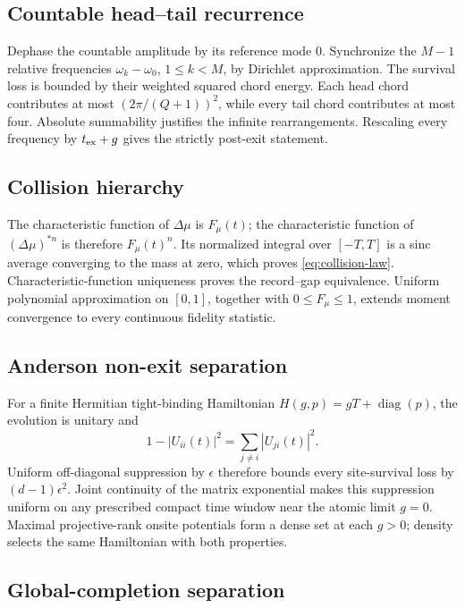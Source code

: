 \documentclass[10pt]{article}
\theoremstyle{definition}
\begin{document}
\subsection*{Countable head--tail recurrence}

Dephase the countable amplitude by its reference mode \(0\). Synchronize
the \(M-1\) relative frequencies
\(\omega_k-\omega_0\), \(1\le k<M\), by Dirichlet approximation. The
survival loss is bounded by their weighted squared chord energy. Each head
chord contributes at most \((2\pi/(Q+1))^2\), while every tail chord
contributes at most four. Absolute summability justifies the infinite
rearrangements. Rescaling every frequency by \(t_{\rm ex}+g\) gives the
strictly post-exit statement.

\subsection*{Collision hierarchy}

The characteristic function of \(\Delta\mu\) is \(F_\mu(t)\); the
characteristic function of \((\Delta\mu)^{*n}\) is therefore
\(F_\mu(t)^n\). Its normalized integral over \([-T,T]\) is a sinc average
converging to the mass at zero, which proves
\eqref{eq:collision-law}. Characteristic-function uniqueness proves the
record--gap equivalence. Uniform polynomial approximation on \([0,1]\),
together with \(0\le F_\mu\le1\), extends moment convergence to every
continuous fidelity statistic.

\subsection*{Anderson non-exit separation}

For a finite Hermitian tight-binding Hamiltonian
\(H(g,p)=gT+\operatorname{diag}(p)\), the evolution is unitary and
\[
 1-|U_{ii}(t)|^2=\sum_{j\ne i}|U_{ji}(t)|^2.
\]
Uniform off-diagonal suppression by \(\epsilon\) therefore bounds every
site-survival loss by \((d-1)\epsilon^2\). Joint continuity of the matrix
exponential makes this suppression uniform on any prescribed compact time
window near the atomic limit \(g=0\). Maximal projective-rank onsite
potentials form a dense set at each \(g>0\); density selects the same
Hamiltonian with both properties.

\subsection*{Global-completion separation}
\end{document}
